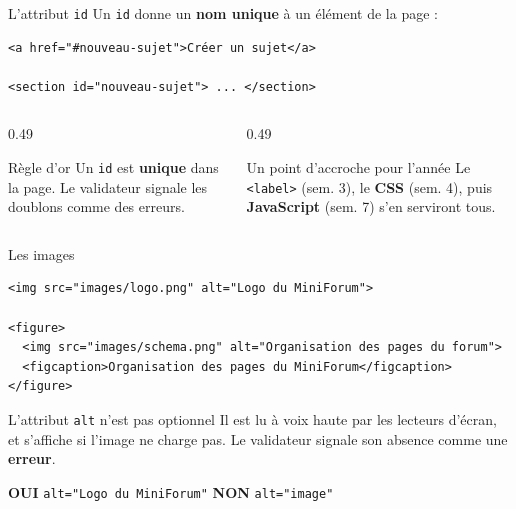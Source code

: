 \documentclass[aspectratio=169,11pt]{beamer}
\begin{document}
\begin{frame}[fragile]{L'attribut \texttt{id}}
  Un \texttt{id} donne un \textbf{nom unique} à un élément de la page :
\begin{lstlisting}[language=HTML5]
<a href="#nouveau-sujet">Créer un sujet</a>

<section id="nouveau-sujet"> ... </section>
\end{lstlisting}
  \vspace{0.15cm}
  \begin{columns}[T]
    \begin{column}{0.49\textwidth}
      \begin{alertblock}{Règle d'or}
        Un \texttt{id} est \textbf{unique} dans la page. Le validateur signale les doublons comme des erreurs.
      \end{alertblock}
    \end{column}
    \begin{column}{0.49\textwidth}
      \begin{block}{Un point d'accroche pour l'année}
        Le \texttt{<label>} (sem. 3), le \textbf{CSS} (sem. 4), puis \textbf{JavaScript} (sem. 7) s'en serviront tous.
      \end{block}
    \end{column}
  \end{columns}
\end{frame}

\begin{frame}[fragile]{Les images}
\begin{lstlisting}[language=HTML5]
<img src="images/logo.png" alt="Logo du MiniForum">

<figure>
  <img src="images/schema.png" alt="Organisation des pages du forum">
  <figcaption>Organisation des pages du MiniForum</figcaption>
</figure>
\end{lstlisting}
  \vspace{0.2cm}
  \begin{alertblock}{L'attribut \texttt{alt} n'est pas optionnel}
    Il est lu à voix haute par les lecteurs d'écran, et s'affiche si l'image ne charge pas. Le validateur signale son absence comme une \textbf{erreur}.
    \vspace{0.15cm}

    \textcolor{successGreen}{\textbf{OUI}} \texttt{alt="Logo du MiniForum"} \qquad
    \textcolor{alertRed}{\textbf{NON}} \texttt{alt="image"}
  \end{alertblock}
\end{frame}
\end{document}
